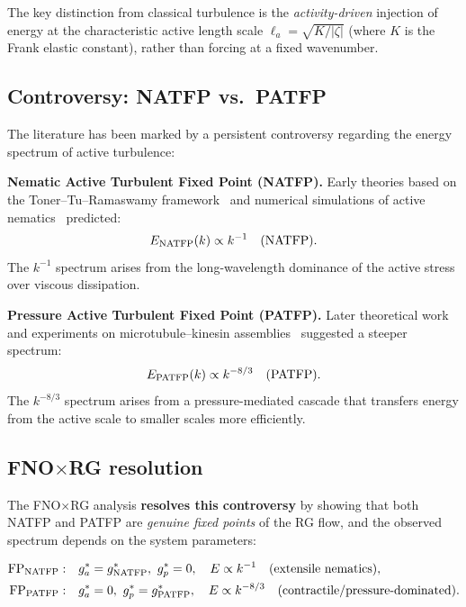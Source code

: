 The key distinction from classical turbulence is the \emph{activity-driven} injection of energy at the characteristic active length scale $\ell_a = \sqrt{K/|\zeta|}$ (where $K$ is the Frank elastic constant), rather than forcing at a fixed wavenumber.

\subsection{Controversy: NATFP vs.\ PATFP}

The literature has been marked by a persistent controversy regarding the energy spectrum of active turbulence:

\textbf{Nematic Active Turbulent Fixed Point (NATFP).} Early theories based on the Toner--Tu--Ramaswamy framework~\cite{toner2005hydrodynamics} and numerical simulations of active nematics~\cite{wensink2012mesoscale} predicted:
\begin{equation}\label{eq:natfp}
E_{\text{NATFP}}(k) \propto k^{-1} \quad (\text{NATFP}).
\end{equation}
The $k^{-1}$ spectrum arises from the long-wavelength dominance of the active stress over viscous dissipation.

\textbf{Pressure Active Turbulent Fixed Point (PATFP).} Later theoretical work~\cite{doostmohammadi2017numerical,santra2021active} and experiments on microtubule--kinesin assemblies~\cite{kumar2018topological,guillamat2022observation} suggested a steeper spectrum:
\begin{equation}\label{eq:patfp}
E_{\text{PATFP}}(k) \propto k^{-8/3} \quad (\text{PATFP}).
\end{equation}
The $k^{-8/3}$ spectrum arises from a pressure-mediated cascade that transfers energy from the active scale to smaller scales more efficiently.

\subsection{\texorpdfstring{FNO$\times$}{FNO x}RG resolution}

The FNO$\times$RG analysis \textbf{resolves this controversy} by showing that both NATFP and PATFP are \emph{genuine fixed points} of the RG flow, and the observed spectrum depends on the system parameters:

{\scriptsize
\begin{align}
 \text{FP}_{\text{NATFP}}: &\quad g_a^* = g_{\text{NATFP}}^*,\ g_p^* = 0, \quad E \propto k^{-1} \quad (\text{extensile nematics}), \nonumber\\
\text{FP}_{\text{PATFP}}: &\quad g_a^* = 0,\ g_p^* = g_{\text{PATFP}}^*, \quad E \propto k^{-8/3} \quad (\text{contractile/pressure-dominated}). \nonumber
\end{align}
}

